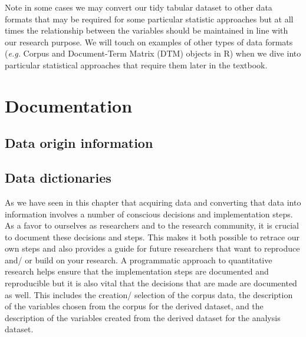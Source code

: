 \documentclass[
  letterpaper,
]{latex/krantz}
\begin{document}
\begin{tcolorbox}[enhanced jigsaw, colframe=quarto-callout-warning-color-frame, titlerule=0mm, coltitle=black, colback=white, opacitybacktitle=0.6, colbacktitle=quarto-callout-warning-color!10!white, left=2mm, arc=.35mm, leftrule=.75mm, rightrule=.15mm, bottomtitle=1mm, toptitle=1mm, breakable, bottomrule=.15mm, title=\textcolor{quarto-callout-warning-color}{\faExclamationTriangle}\hspace{0.5em}{Tip}, toprule=.15mm, opacityback=0]

Note in some cases we may convert our tidy tabular dataset to other data
formats that may be required for some particular statistic approaches
but at all times the relationship between the variables should be
maintained in line with our research purpose. We will touch on examples
of other types of data formats (\emph{e.g.} Corpus and Document-Term
Matrix (DTM) objects in R) when we dive into particular statistical
approaches that require them later in the textbook.

\end{tcolorbox}

\hypertarget{documentation}{%
\section{Documentation}\label{documentation}}

\hypertarget{data-origin-information}{%
\subsection{Data origin information}\label{data-origin-information}}

\hypertarget{data-dictionaries}{%
\subsection{Data dictionaries}\label{data-dictionaries}}

As we have seen in this chapter that acquiring data and converting that
data into information involves a number of conscious decisions and
implementation steps. As a favor to ourselves as researchers and to the
research community, it is crucial to document these decisions and steps.
This makes it both possible to retrace our own steps and also provides a
guide for future researchers that want to reproduce and/ or build on
your research. A programmatic approach to quantitative research helps
ensure that the implementation steps are documented and reproducible but
it is also vital that the decisions that are made are documented as
well. This includes the creation/ selection of the corpus data, the
description of the variables chosen from the corpus for the derived
dataset, and the description of the variables created from the derived
dataset for the analysis dataset.
\end{document}
